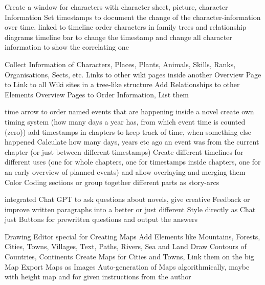 \begin{outline}
    \1 Create a window for characters with character sheet, picture, character Information
    \1 Set timestamps to document the change of the character-information over time, linked to timeline
    \1 order characters in family trees and relationship diagrams
    \1 timeline bar to change the timestamp and change all character information to show the correlating one
\end{outline}

\begin{outline}
    \1 Collect Information of Characters, Places, Plants, Animals, Skills, Ranks, Organisations, Sects, etc.
    \1 Links to other wiki pages inside another
    \1 Overview Page to Link to all Wiki sites in a tree-like structure
    \1 Add Relationships to other Elements
    \1 Overview Pages to Order Information, List them
\end{outline}

\begin{outline}
    \1 time arrow to order named events that are happening inside a novel
      \2 create own timing system (how many days a year has, from which event time is counted (zero))
      \2 add timestamps in chapters to keep track of time, when something else happened
      \2 Calculate how many days, years etc ago an event was from the current chapter (or just between different timestamps)
    \1 Create different timelines for different uses (one for whole chapters, one for timestamps inside chapters, one for an early overview of planned events) and allow overlaying and merging them
    \1 Color Coding sections or group together different parts as story-arcs
\end{outline}

\begin{outline}
    \1 integrated Chat GPT to ask questions about novels, give creative Feedback or improve written paragraphs into a better or just different Style
      \2 directly as Chat
      \2 just Buttons for prewritten questions and output the answers
\end{outline}

\begin{outline}
    \1 Drawing Editor special for Creating Maps
      \2 Add Elements like Mountains, Forests, Cities, Towns, Villages, Text, Paths, Rivers, Sea and Land
      \2 Draw Contours of Countries, Continents
    \1 Create Maps for Cities and Towns, Link them on the big Map
    \1 Export Maps as Images
    \1 Auto-generation of Maps algorithmically, maybe with height map and for given instructions from the author
\end{outline}


